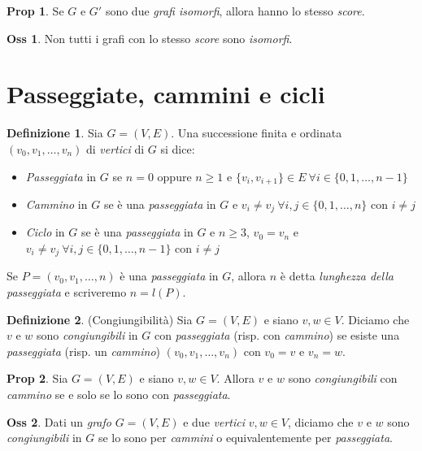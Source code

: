 \documentclass[12pt, a4paper]{report}
\theoremstyle{definition}
\newtheorem{definition}{Definizione}[section]
\newtheorem{observation}{Oss}[section]
\newtheorem*{proposition}{Prop}
\begin{document}
\begin{proposition}
    Se $G$ e $G'$ sono due \emph{grafi isomorfi}, allora hanno lo stesso \emph{score}.
\end{proposition}
\begin{observation}
    Non tutti i grafi con lo stesso \emph{score} sono \emph{isomorfi}.
\end{observation}

\section{Passeggiate, cammini e cicli}
\begin{definition}
    Sia $G=(V,E)$. Una successione finita e ordinata $(v_0,v_1,\dots,v_n)$ di
    \emph{vertici} di $G$ si dice:
    \begin{itemize}
        \item \emph{Passeggiata} in $G$ se $n=0$ oppure $n\geq1$ e $\{v_i,v_{i+1}\}
        \in E\ \forall i\in\{0,1,\dots,n-1\}$
        \item \emph{Cammino} in $G$ se è una \emph{passeggiata} in $G$ e $v_i\neq v_j
        \ \forall i,j\in\{0,1,\dots,n\}$ con $i\neq j$
        \item \emph{Ciclo} in $G$ se è una \emph{passeggiata} in $G$ e $n\geq 3$,
        $v_0=v_n$ e $v_i\neq v_j\ \forall i,j\in\{0,1,\dots,n-1\}$ con $i\neq j$
    \end{itemize}
    Se $P=(v_0,v_1,\dots,n)$ è una \emph{passeggiata} in $G$, allora $n$ è detta
    \emph{lunghezza della passeggiata} e scriveremo $n=l(P)$.
\end{definition}

\begin{definition}(Congiungibilità)
    Sia $G=(V,E)$ e siano $v,w\in V$. Diciamo che $v$ e $w$ sono \emph{congiungibili}
    in $G$ con \emph{passeggiata} (risp. con \emph{cammino}) se esiste una
    \emph{passeggiata} (risp. un \emph{cammino}) $(v_0,v_1,\dots,v_n)$ con $v_0=v$
    e $v_n=w$.
\end{definition}

\begin{proposition}
    Sia $G=(V,E)$ e siano $v,w\in V$. Allora $v$ e $w$ sono \emph{congiungibili}
    con \emph{cammino} se e solo se lo sono con \emph{passeggiata}.
\end{proposition}

\begin{observation}
    Dati un \emph{grafo} $G=(V,E)$ e due \emph{vertici} $v,w\in V$, diciamo che
    $v$ e $w$ sono \emph{congiungibili} in $G$ se lo sono per \emph{cammini} o
    equivalentemente per \emph{passeggiata}.
\end{observation}
\end{document}
